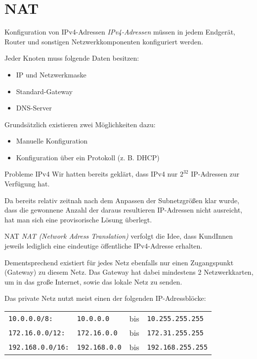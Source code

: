 \section{NAT}

\begin{bonus}{Konfiguration von IPv4-Adressen}
    \emph{IPv4-Adressen} müssen in jedem Endgerät, Router und sonstigen Netzwerkkomponenten konfiguriert werden.

    Jeder Knoten muss folgende Daten besitzen:
    \begin{itemize}
        \item IP und Netzwerkmaske
        \item Standard-Gateway
        \item DNS-Server
    \end{itemize}

    Grundsätzlich existieren zwei Möglichkeiten dazu:
    \begin{itemize}
        \item Manuelle Konfiguration
        \item Konfiguration über ein Protokoll (z. B. DHCP)
    \end{itemize}
\end{bonus}

\begin{bonus}{Probleme IPv4}
    Wir hatten bereits geklärt, dass IPv4 nur $2^{32}$ IP-Adressen zur Verfügung hat.

    Da bereits relativ zeitnah nach dem Anpassen der Subnetzgrößen klar wurde, dass die gewonnene Anzahl der daraus resultieren IP-Adressen nicht ausreicht, hat man sich eine provisorische Lösung überlegt.
\end{bonus}

\begin{defi}{NAT}
    \emph{NAT (Network Adress Translation)} verfolgt die Idee, dass KundInnen jeweils lediglich eine eindeutige öffentliche IPv4-Adresse erhalten.

    Dementsprechend existiert für jedes Netz ebenfalls nur einen Zugangspunkt (Gateway) zu diesem Netz.
    Das Gateway hat dabei mindestens 2 Netzwerkkarten, um in das große Internet, sowie das lokale Netz zu senden.

    Das private Netz nutzt meist einen der folgenden IP-Adressblöcke:

    \begin{tabular}{llcl}
        \texttt{10.0.0.0/8:}     & \texttt{10.0.0.0}    & bis & \texttt{10.255.255.255}  \\
        \texttt{172.16.0.0/12:}  & \texttt{172.16.0.0}  & bis & \texttt{172.31.255.255}  \\
        \texttt{192.168.0.0/16:} & \texttt{192.168.0.0} & bis & \texttt{192.168.255.255}
    \end{tabular}
\end{defi}

